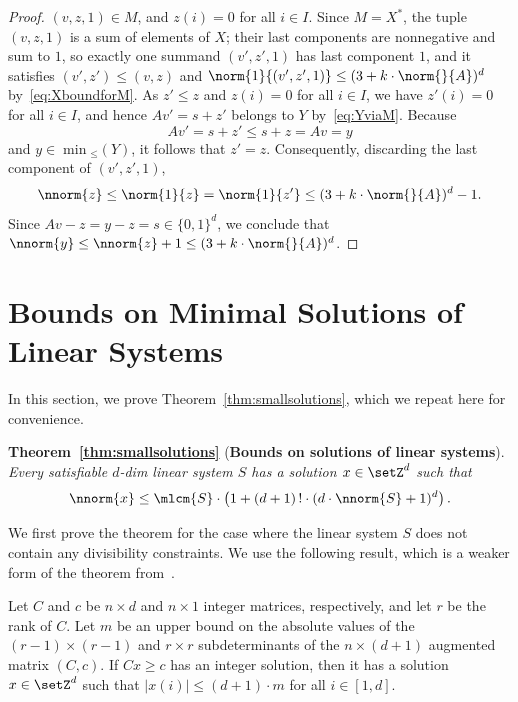\begin{proof}
	$(v,z,1)\in M$,
and $z(i)=0$ for all $i\in I$.
	Since $M=X^*$, the tuple $(v,z,1)$ is a sum of elements of $X$;
	their last components are nonnegative and sum to $1$, so exactly
	one summand $(v',z',1)$ has last component $1$, and it satisfies
	$(v',z')\leq (v,z)$ and
	$\norm{1}{(v',z',1)}\leq (3+k\cdot\norm{}{A})^d$
	by~\eqref{eq:XboundforM}.
	As $z'\leq z$ and $z(i)=0$ for all $i\in I$, we have $z'(i)=0$ for
	all $i\in I$, and hence $Av'=s+z'$ belongs to $Y$
	by~\eqref{eq:YviaM}.
	Because 
	\[Av'=s+z'\leq s+z=Av=y\] and $y\in \min{}_{\leq}(Y)$, it
	follows that $z'=z$. 
	Consequently, discarding the last component of $(v',z',1)$,
	\[\nnorm{z}\leq\norm{1}{z}=\norm{1}{z'}\leq (3+k\cdot\norm{}{A})^d-1.\]
	Since $Av-z=y-z=s\in\{0,1\}^d$,
	we conclude that $\nnorm{y}\leq\nnorm{z}+1\leq
	(3+k\cdot\norm{}{A})^d$.
\end{proof}

\section{Bounds on Minimal Solutions of Linear Systems}\label{sec:smallsolutions}


In this section, we prove Theorem~\ref{thm:smallsolutions}, which we
repeat here for convenience.

\medskip
\noindent
	\textbf{Theorem~\ref{thm:smallsolutions}} (\textbf{Bounds on solutions of linear
	systems}).
\hfill\\
	\emph{
Every satisfiable $d$-dim linear system $S$ 
 has a solution $x\in\setZ^d$ such that
	\[\nnorm{x}\leq
		\mlcm{S} \cdot \left(1+ (d+1)\,!\cdot (d\cdot
		\nnorm{S}+1)^{d}\right).\]
}
\medskip


We first prove the theorem for the case where the linear system $S$
	does not contain any divisibility constraints. We use the
	following result, which is a weaker form of the theorem from~\cite{Gathen1978}.

	\begin{lemC}\label{lem:Gathen}
Let $C$ and $c$ be $n\times d$ and $n\times 1$ integer matrices, respectively,
and let $r$ be the rank of $C$. Let $m$ be an
	upper bound on the absolute values of the $(r-1)\times (r-1)$
	and $r\times r$ subdeterminants of the $n\times (d+1)$
	augmented matrix
	$(C, c)$. If $Cx\geq c$ has an integer solution, then it has
	a solution $x\in \setZ^d$ such that $|x(i)|\leq (d+1)\cdot m$ for
	all $i\in [1,d]$.
\end{lemC}

